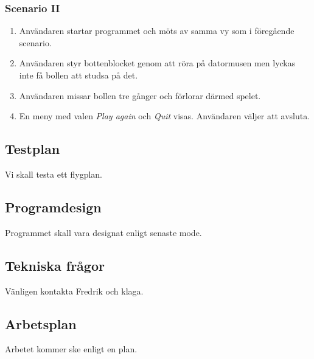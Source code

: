 \documentclass[11pt,a4paper]{article}
\begin{document}
\subsubsection{Scenario II}
\begin{enumerate}
	\item Användaren startar programmet och möts av samma vy som i föregående scenario.
	\item Användaren styr bottenblocket genom att röra på datormusen men lyckas inte få bollen att studsa på det.
	\item Användaren missar bollen tre gånger och förlorar därmed spelet.
	\item En meny med valen \emph{Play again} och \emph{Quit} visas. Användaren väljer att avsluta.
\end{enumerate}

\subsection{Testplan}
Vi skall testa ett flygplan.

\subsection{Programdesign}
Programmet skall vara designat enligt senaste mode.

\subsection{Tekniska frågor}
Vänligen kontakta Fredrik och klaga.

\subsection{Arbetsplan}
Arbetet kommer ske enligt en plan.
\end{document}
